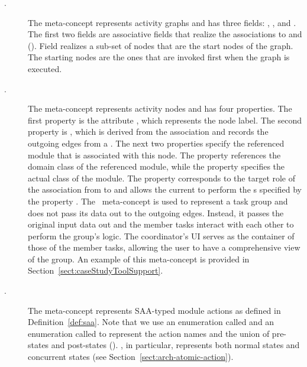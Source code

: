 %
\begin{description}
		\item[.] The  meta-concept represents activity graphs and has three fields: , , and . The first two fields are associative fields that realize the associations to  and  (\resp). Field  realizes a sub-set of nodes that are the start nodes of the graph. The starting nodes are the ones that are invoked first when the graph is executed.
	\item[.] The  meta-concept represents activity nodes and has four properties. The first property is the attribute , which represents the node label. The second property is , which is derived from the association  and records the outgoing edges from a . The next two properties specify the referenced module that is associated with this node. The  property references the domain class of the referenced module, while the  property specifies the actual  class of the module. The  property corresponds to the target role of the association from  to  and allows the current  to perform the s specified by the property . The~ meta-concept is used to represent a task group and does not pass its data out to the outgoing edges. Instead, it passes the original input data out and the member tasks interact with each other to perform the group's logic. The coordinator's UI serves as the container of those of the member tasks, allowing the user to have a comprehensive view of the group. An example of this meta-concept is provided in Section~\ref{sect:caseStudyToolSupport}.
	\item[.] The  meta-concept represents SAA-typed module actions as defined in Definition~\ref{def:saa}. Note that we use an enumeration called  and an enumeration called  to represent the action names and the union of pre-states and post-states (\resp). , in particular, represents both normal states and concurrent states (see Section~\ref{sect:arch-atomic-action}).

\end{description}
